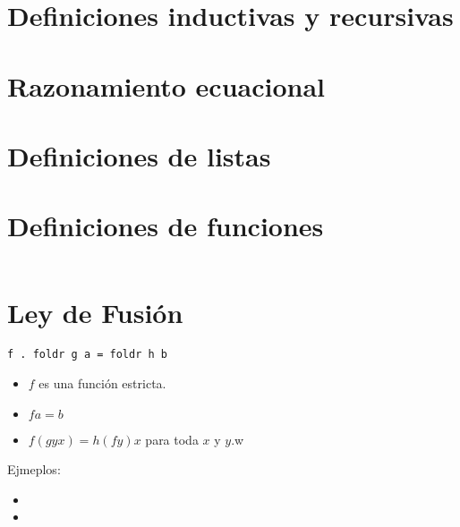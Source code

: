 \section{Definiciones inductivas y recursivas}

\section{Razonamiento ecuacional}


\section{Definiciones de listas}

\section{Definiciones de funciones}
\inputminted{haskell}{definiciones/map.hs}



\section{Ley de Fusión}

\begin{verbatim}
f . foldr g a = foldr h b
\end{verbatim}

\begin{itemize}
    \item $f$ es una función estricta.
    \item $f a = b$
    \item $f (g y x) = h (f y) x$ para toda $x$ y $y$.w
\end{itemize}

Ejmeplos:
\begin{itemize}
    \item {}
    \item {}
\end{itemize}




